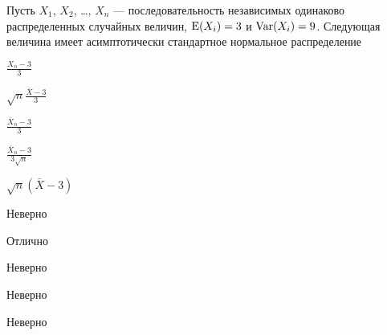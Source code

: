 
\begin{question}
Пусть \(X_1\), \(X_2\), \ldots, \(X_n\) — последовательность
независимых одинаково распределенных случайных величин, \(\operatorname{E}(X_i)=3\) и
\(\operatorname{Var}(X_i)=9\). Следующая величина имеет асимптотически стандартное
нормальное распределение
\begin{answerlist}
  \item \(\frac{X_n-3}{3}\)
  \item \(\sqrt{n}\frac{\bar{X}-3}{3}\)
  \item \(\frac{\bar{X}_n-3}{3}\)
  \item \(\frac{\bar{X}_n-3}{3\sqrt{n}}\)
  \item \(\sqrt{n}(\bar{X}-3)\)
\end{answerlist}
\end{question}

\begin{solution}
\begin{answerlist}
  \item Неверно
  \item Отлично
  \item Неверно
  \item Неверно
  \item Неверно
\end{answerlist}
\end{solution}

